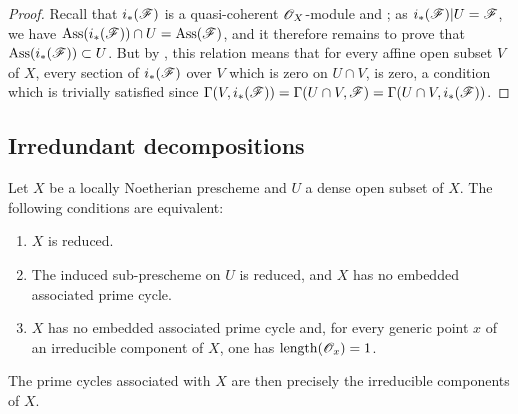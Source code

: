 \begin{proof}
Recall that $i_*(\mathscr{F})$ is a quasi-coherent $\mathscr{O}_X$-module  and ; as $i_*(\mathscr{F})|U=\mathscr{F}$, we have $\operatorname{Ass}(i_*(\mathscr{F}))\cap U=\operatorname{Ass}(\mathscr{F})$, and it therefore remains to prove that $\operatorname{Ass}(i_*(\mathscr{F}))\subset U$.
But by , this relation means that for every affine open subset $V$ of $X$, every section of $i_*(\mathscr{F})$ over $V$ which is zero on $U\cap V$, is zero, a condition which is trivially satisfied since $\Gamma(V,i_*(\mathscr{F}))=\Gamma(U\cap V,\mathscr{F})=\Gamma(U\cap V,i_*(\mathscr{F}))$.
\end{proof}


\subsection{Irredundant decompositions}
\label{subsection:IV.3.2}

\begin{proposition}[3.2.1]
\label{IV.3.2.1}
Let $X$ be a locally Noetherian prescheme and $U$ a dense open subset of $X$.
The following conditions are equivalent:
\begin{enumerate}
  \item[\emph{a)}] $X$ is reduced.
  \item[\emph{b)}] The induced sub-prescheme on $U$ is reduced, and $X$ has no embedded associated prime cycle.
  \item[\emph{c)}] $X$ has no embedded associated prime cycle and, for every generic point $x$ of an irreducible component of $X$, one has $\operatorname{length}(\mathscr{O}_x)=1$.
\end{enumerate}
The prime cycles associated with $X$ are then precisely the irreducible components of $X$.
\end{proposition}

